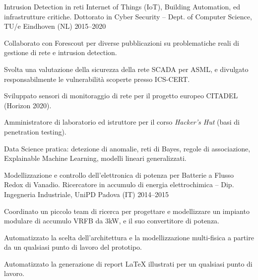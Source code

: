 
\begin{cventries}
    \cventry%
        {Intrusion Detection in reti Internet of Things (IoT), Building Automation, ed infrastrutture critiche.} %
        {Dottorato in Cyber Security -- Dept. of Computer Science, TU/e} %
        {Eindhoven (NL)} %
        {2015--2020} %
        {\begin{cvitems}
            \item Collaborato con Forescout per diverse pubblicazioni su problematiche reali di gestione di rete e intrusion detection.
            \item Svolta una valutazione della sicurezza della rete SCADA per ASML, e divulgato responsabilmente le vulnerabilità scoperte presso ICS-CERT.
            \item Sviluppato sensori di monitoraggio di rete per il progetto europeo CITADEL (Horizon 2020).
            \item Amministratore di laboratorio ed istruttore per il corso \emph{Hacker's Hut} (basi di penetration testing).
            \item Data Science pratica: detezione di anomalie, reti di Bayes, regole di associazione, Explainable Machine Learning, modelli lineari generalizzati.
        \end{cvitems}}


    \cventry%
        {Modellizzazione e controllo dell'elettronica di potenza per Batterie a Flusso Redox di Vanadio.}
        {Ricercatore in accumulo di energia elettrochimica -- Dip. Ingegneria Industriale, UniPD}
        {Padova (IT)}
        {2014--2015}
        {\begin{cvitems}
            \item Coordinato un piccolo team di ricerca per progettare e modellizzare un impianto modulare di accumulo VRFB da 3kW, e il suo convertitore di potenza.
            \item Automatizzato la scelta dell'architettura e la modellizzazione multi-fisica a partire da un qualsiasi punto di lavoro del prototipo.
            \item Automatizzato la generazione di report LaTeX illustrati per un qualsiasi punto di lavoro.
        \end{cvitems}}


\end{cventries}
